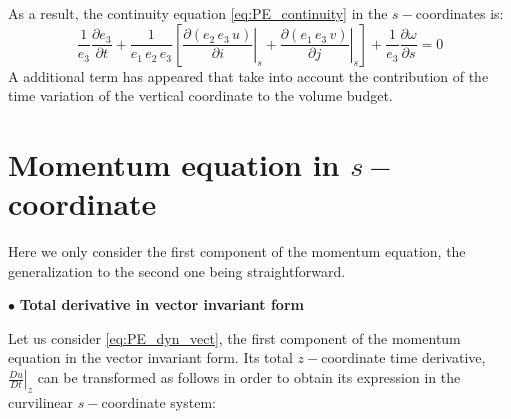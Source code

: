 \documentclass[../main/NEMO_manual]{subfiles}
\begin{document}
As a result, the continuity equation \autoref{eq:PE_continuity} in the $s-$coordinates is:
\begin{equation}
  \label{apdx:A_sco_Continuity}
  \frac{1}{e_3 } \frac{\partial e_3}{\partial t}
  + \frac{1}{e_1 \,e_2 \,e_3 }\left[
    {\left. {\frac{\partial (e_2 \,e_3 \,u)}{\partial i}} \right|_s
      +  \left. {\frac{\partial (e_1 \,e_3 \,v)}{\partial j}} \right|_s } \right]
  +\frac{1}{e_3 }\frac{\partial \omega }{\partial s} = 0
\end{equation}
A additional term has appeared that take into account
the contribution of the time variation of the vertical coordinate to the volume budget.


\section{Momentum equation in $s-$coordinate}
\label{sec:A_momentum}

Here we only consider the first component of the momentum equation,
the generalization to the second one being straightforward.

$\bullet$ \textbf{Total derivative in vector invariant form}

Let us consider \autoref{eq:PE_dyn_vect}, the first component of the momentum equation in the vector invariant form.
Its total $z-$coordinate time derivative,
$\left. \frac{D u}{D t} \right|_z$ can be transformed as follows in order to obtain
its expression in the curvilinear $s-$coordinate system:
\end{document}
